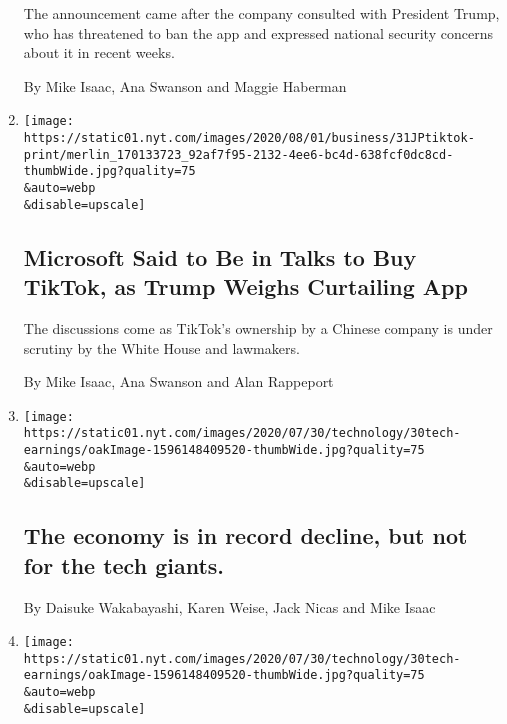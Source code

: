 \begin{enumerate}
  The announcement came after the company consulted with President
  Trump, who has threatened to ban the app and expressed national
  security concerns about it in recent weeks.

  By Mike Isaac, Ana Swanson and Maggie Haberman
\item
  \href{/2020/07/31/technology/tiktok-microsoft.html}{}

  \texttt{[image: https://static01.nyt.com/images/2020/08/01/business/31JPtiktok-print/merlin\_170133723\_92af7f95-2132-4ee6-bc4d-638fcf0dc8cd-thumbWide.jpg?quality=75\\\&auto=webp\\\&disable=upscale]}

  \hypertarget{microsoft-said-to-be-in-talks-to-buy-tiktok-as-trump-weighs-curtailing-app}{%
  \subsection{Microsoft Said to Be in Talks to Buy TikTok, as Trump
  Weighs Curtailing
  App}\label{microsoft-said-to-be-in-talks-to-buy-tiktok-as-trump-weighs-curtailing-app}}

  The discussions come as TikTok's ownership by a Chinese company is
  under scrutiny by the White House and lawmakers.

  By Mike Isaac, Ana Swanson and Alan Rappeport
\item
  \href{/live/2020/07/31/business/stock-market-today-coronavirus/the-economy-is-in-record-decline-but-not-for-the-tech-giants}{}

  \texttt{[image: https://static01.nyt.com/images/2020/07/30/technology/30tech-earnings/oakImage-1596148409520-thumbWide.jpg?quality=75\\\&auto=webp\\\&disable=upscale]}

  \hypertarget{the-economy-is-in-record-decline-but-not-for-the-tech-giants}{%
  \subsection{The economy is in record decline, but not for the tech
  giants.}\label{the-economy-is-in-record-decline-but-not-for-the-tech-giants}}

  By Daisuke Wakabayashi, Karen Weise, Jack Nicas and Mike Isaac
\item
  \href{/2020/07/30/technology/tech-company-earnings-amazon-apple-facebook-google.html}{}

  \texttt{[image: https://static01.nyt.com/images/2020/07/30/technology/30tech-earnings/oakImage-1596148409520-thumbWide.jpg?quality=75\\\&auto=webp\\\&disable=upscale]}


\end{enumerate}
